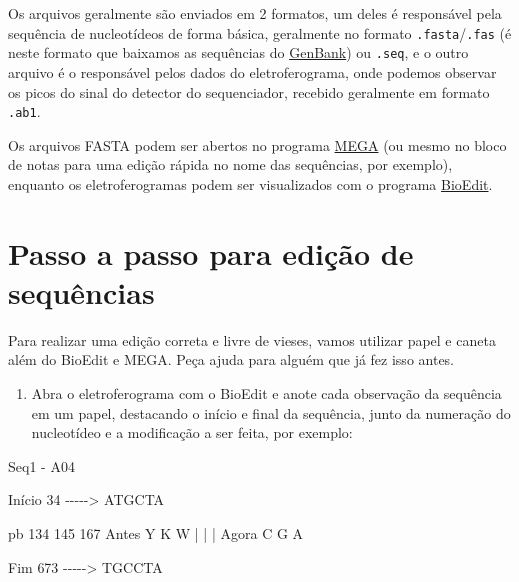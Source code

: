 \documentclass[
  letterpaper,
  DIV=11,
  numbers=noendperiod]{scrreprt}
\newenvironment{Shaded}{\begin{snugshade}}{\end{snugshade}}
\newcommand{\DecValTok}[1]{\textcolor[rgb]{0.68,0.00,0.00}{#1}}
\newcommand{\ErrorTok}[1]{\textcolor[rgb]{0.68,0.00,0.00}{#1}}
\newcommand{\NormalTok}[1]{\textcolor[rgb]{0.00,0.23,0.31}{#1}}
\newcommand{\OtherTok}[1]{\textcolor[rgb]{0.00,0.23,0.31}{#1}}
\newcommand{\SpecialCharTok}[1]{\textcolor[rgb]{0.37,0.37,0.37}{#1}}
\providecommand{\tightlist}{%
  \setlength{\itemsep}{0pt}\setlength{\parskip}{0pt}}\usepackage{longtable,booktabs,array}
\begin{document}
Os arquivos geralmente são enviados em 2 formatos, um deles é
responsável pela sequência de nucleotídeos de forma básica, geralmente
no formato \texttt{.fasta}/\texttt{.fas} (é neste formato que baixamos
as sequências do \protect\hyperlink{genbank}{GenBank}) ou \texttt{.seq},
e o outro arquivo é o responsável pelos dados do eletroferograma, onde
podemos observar os picos do sinal do detector do sequenciador, recebido
geralmente em formato \texttt{.ab1}.

Os arquivos FASTA podem ser abertos no programa
\protect\hyperlink{mega}{MEGA} (ou mesmo no bloco de notas para uma
edição rápida no nome das sequências, por exemplo), enquanto os
eletroferogramas podem ser visualizados com o programa
\protect\hyperlink{bioedit}{BioEdit}.

\hypertarget{passo-a-passo-para-ediuxe7uxe3o-de-sequuxeancias}{%
\section{Passo a passo para edição de
sequências}\label{passo-a-passo-para-ediuxe7uxe3o-de-sequuxeancias}}

Para realizar uma edição correta e livre de vieses, vamos utilizar papel
e caneta além do BioEdit e MEGA. Peça ajuda para alguém que já fez isso
antes.

\begin{enumerate}
\def\labelenumi{\arabic{enumi}.}
\tightlist
\item
  Abra o eletroferograma com o BioEdit e anote cada observação da
  sequência em um papel, destacando o início e final da sequência, junto
  da numeração do nucleotídeo e a modificação a ser feita, por exemplo:
\end{enumerate}

\begin{Shaded}
\begin{Highlighting}[]
\NormalTok{Seq1 }\SpecialCharTok{{-}}\NormalTok{ A04}

\NormalTok{Início }
\DecValTok{34}
\SpecialCharTok{{-}{-}{-}{-}}\OtherTok{{-}\textgreater{}}
\NormalTok{ATGCTA}

\NormalTok{pb      }\DecValTok{134} \DecValTok{145} \DecValTok{167}
\NormalTok{Antes    Y   K   W}
         \SpecialCharTok{|}   \ErrorTok{|}   \ErrorTok{|}
\NormalTok{Agora    C   G   A}

\NormalTok{Fim}
    \DecValTok{673} 
\SpecialCharTok{{-}{-}{-}{-}}\OtherTok{{-}\textgreater{}}
\NormalTok{TGCCTA}
\end{Highlighting}
\end{Shaded}
\end{document}
